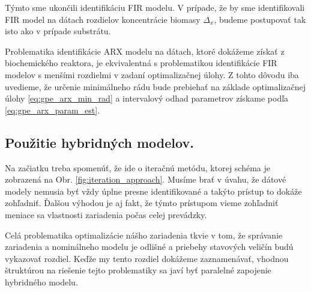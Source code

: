 Týmto sme ukončili identifikáciu FIR modelu. V prípade, že by sme identifikovali FIR model na dátach rozdielov koncentrácie biomasy $ \Delta_{x} $, budeme postupovať tak isto ako v prípade substrátu.

Problematika identifikácie ARX modelu na dátach, ktoré dokážeme získať z biochemického reaktora, je ekvivalentná s problematikou identifikácie FIR modelov s menšími rozdielmi v zadaní optimalizačnej úlohy. Z tohto dôvodu iba uvedieme, že určenie minimálneho rádu bude prebiehať na základe optimalizačnej úlohy \eqref{eq:gpe_arx_min_rad} a intervalový odhad parametrov získame podľa \eqref{eq:gpe_arx_param_est}.

\subsection*{Použitie hybridných modelov.}
Na začiatku treba spomenúť, že ide o iteračnú metódu, ktorej schéma je zobrazená na Obr. \ref{fig:iteration_approach}. Musíme brať v úvahu, že dátové modely nemusia byť vždy úplne presne identifikované a takýto prístup to dokáže zohľadniť. Ďalšou výhodou je aj fakt, že týmto prístupom vieme zohľadniť meniace sa vlastnosti zariadenia počas celej prevádzky.

Celá problematika optimalizácie nášho zariadenia tkvie v tom, že správanie zariadenia a nominálneho modelu je odlišné a priebehy stavových veličín budú vykazovať rozdiel. Keďže my tento rozdiel dokážeme zaznamenávať, vhodnou štruktúrou na riešenie tejto problematiky sa javí byť paralelné zapojenie hybridného modelu.

